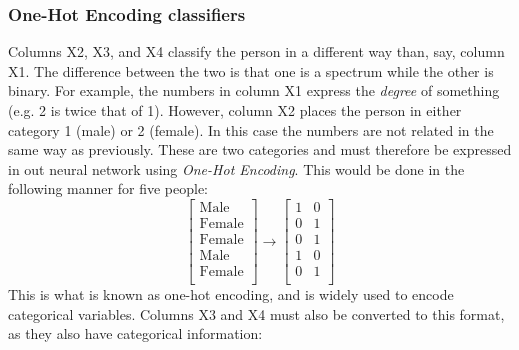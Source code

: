         \subsubsection{One-Hot Encoding classifiers}
            Columns X2, X3, and X4 classify the person in a different way than, say, column X1. The difference between the two is that one is a spectrum while the other is binary. For example, the numbers in column X1 express the \textit{degree} of something (e.g. 2 is twice that of 1). However, column X2 places the person in either category 1 (male) or 2 (female). In this case the numbers are not related in the same way as previously. These are two categories and must therefore be expressed in out neural network using \textit{One-Hot Encoding}. This would be done in the following manner for five people:
            \begin{equation}
                \begin{bmatrix}
                \text{Male}\\
                \text{Female}\\
                \text{Female}\\
                \text{Male}\\
                \text{Female}\\
                \end{bmatrix}
                \rightarrow
                \begin{bmatrix}
                1 & 0 \\
                0 & 1 \\
                0 & 1 \\
                1 & 0 \\
                0 & 1 \\
                \end{bmatrix}
            \end{equation}
            This is what is known as one-hot encoding, and is widely used to encode categorical variables. Columns X3 and X4 must also be converted to this format, as they also have categorical information:
